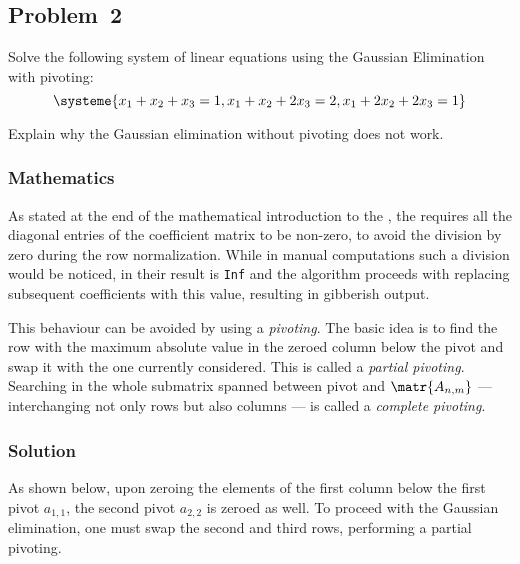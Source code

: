 \subsection{Problem~2}%
\label{problem:2}

Solve the following system of linear equations using the Gaussian Elimination with
pivoting:
\begin{equation*}
    \systeme{x_1+x_2+x_3=1,x_1+x_2+2x_3=2,x_1+2x_2+2x_3=1}
\end{equation*}

Explain why the Gaussian elimination without pivoting does not work.

\subsubsection*{Mathematics}

As stated at the end of the mathematical introduction to the ,
the  requires all the diagonal entries of the coefficient
matrix to be non-zero, to avoid the division by zero during the row normalization.
While in manual computations such a division would be noticed, in \MATLAB their result
is \texttt{Inf} and the algorithm proceeds with replacing subsequent coefficients with
this value, resulting in gibberish output.

This behaviour can be avoided by using a \textit{pivoting}.
The basic idea is to find the row with the maximum absolute value in the zeroed column below the
pivot and swap it with the one currently considered.
This is called a \textit{partial pivoting}.
Searching in the whole submatrix spanned between pivot and $\matr{A_{n,m}}$ ---
 interchanging not only rows but also columns --- is called a \textit{complete pivoting}.

\subsubsection*{Solution}

As shown below, upon zeroing the elements of the first column below the first pivot $a_{1,1}$, the second pivot $a_{2,2}$ is zeroed as well.
To proceed with the Gaussian elimination, one must swap the second and third rows, performing a partial pivoting.

